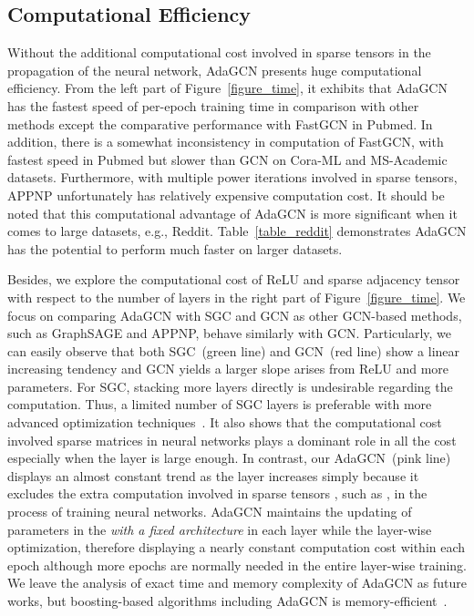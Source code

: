 \documentclass{article} \usepackage{iclr2021_conference,times}
\begin{document}
\subsection{Computational Efficiency} \label{sec:experiment_computation}

Without the additional computational cost involved in sparse tensors in the propagation of the neural network, AdaGCN presents huge computational efficiency. From the left part of Figure~\ref{figure_time}, it exhibits that AdaGCN has the fastest speed of per-epoch training time in comparison with other methods except the comparative performance with FastGCN in Pubmed. In addition, there is a somewhat inconsistency in computation of FastGCN, with fastest speed in Pubmed but slower than GCN on Cora-ML and MS-Academic datasets. Furthermore, with multiple power iterations involved in sparse tensors, APPNP unfortunately has relatively expensive computation cost. It should be noted that this computational advantage of AdaGCN is more significant when it comes to large datasets, e.g., Reddit. Table~\ref{table_reddit} demonstrates AdaGCN has the potential to perform much faster on larger datasets.

Besides, we explore the computational cost of ReLU and sparse adjacency tensor with respect to the number of layers in the right part of Figure~\ref{figure_time}. We focus on comparing AdaGCN with SGC and GCN as other GCN-based methods, such as GraphSAGE and APPNP, behave similarly with GCN. Particularly, we can easily observe that both SGC~(green line) and GCN~(red line) show a linear increasing tendency and GCN yields a larger slope arises from ReLU and more parameters. For SGC, stacking more layers directly is undesirable regarding the computation. Thus, a limited number of SGC layers is preferable with more advanced optimization techniques~\cite{wu2019simplifying}. It also shows that the computational cost involved sparse matrices in neural networks plays a dominant role in all the cost especially when the layer is large enough. In contrast, our AdaGCN~(pink line) displays an almost constant trend as the layer increases simply because it excludes the extra computation involved in sparse tensors , such as , in the process of training neural networks. AdaGCN maintains the updating of parameters in the  \textit{with a fixed architecture} in each layer while the layer-wise optimization, therefore displaying a nearly constant computation cost within each epoch although more epochs are normally needed in the entire layer-wise training. We leave the analysis of exact time and memory complexity of AdaGCN as future works, but boosting-based algorithms including AdaGCN is memory-efficient~\citep{oono2020optimization}.
\end{document}
